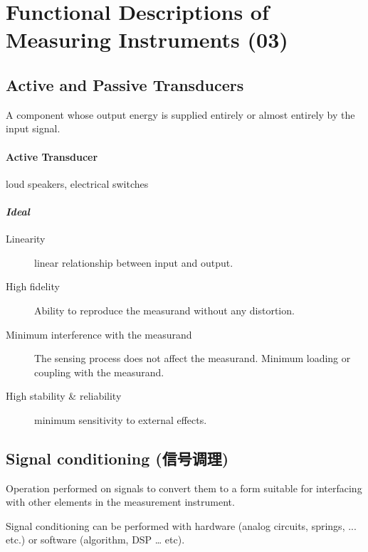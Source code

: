 \documentclass[a4paper,UTF8]{article}
\theoremstyle{mystyle}{
  \newtheorem{law}{Law}
}
\begin{document}
\section{Functional Descriptions of Measuring Instruments (03)}
\subsection{Active and Passive Transducers }
A component whose output energy is supplied entirely
or almost entirely by the input signal.
\paragraph{Active Transducer} 
loud speakers, electrical switches

\paragraph{\textit{Ideal}}
\begin{description}
\item[Linearity] linear relationship between input and output.
\item[High fidelity] Ability to reproduce the measurand without any distortion.
\item[Minimum interference with the measurand] The sensing process does not affect the measurand. Minimum loading or coupling with the measurand.
\item[High stability \& reliability] minimum sensitivity to external effects.
\end{description}

\subsection{Signal conditioning (信号调理)}

Operation performed on signals to convert them to a form suitable for interfacing with other elements in the measurement instrument.

Signal conditioning can be performed with hardware (analog
circuits, springs, ... etc.) or software (algorithm, DSP … etc).
\end{document}
